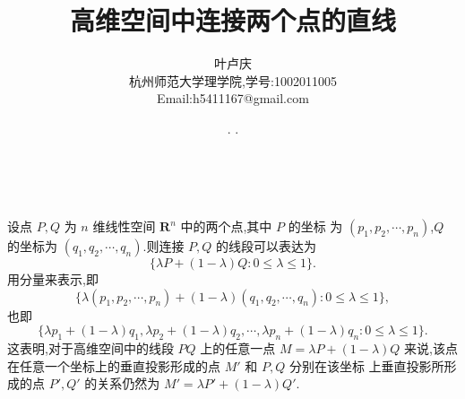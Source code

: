 \documentclass[a4paper, 12pt]{article} %
\makeatletter
\renewcommand{\maketitle}{ %
  \renewcommand\refname{参考文献}
  \newcommand{\D}{\displaystyle}\newcommand{\ri}{\Rightarrow}
  \newcommand{\ds}{\displaystyle} \renewcommand{\ni}{\noindent}
  \newcommand{\pa}{\partial} \newcommand{\Om}{\Omega}
  \newcommand{\om}{\omega} \newcommand{\sik}{\sum_{i=1}^k}
  \newcommand{\vov}{\Vert\omega\Vert} \newcommand{\Umy}{U_{\mu_i,y^i}}
  \newcommand{\lamns}{\lambda_n^{^{\scriptstyle\sigma}}}
  \newcommand{\chiomn}{\chi_{_{\Omega_n}}}
  \newcommand{\ullim}{\underline{\lim}} \newcommand{\bsy}{\boldsymbol}
  \newcommand{\mvb}{\mathversion{bold}} \newcommand{\la}{\lambda}
  \newcommand{\La}{\Lambda} \newcommand{\va}{\varepsilon}
  \newcommand{\be}{\beta} \newcommand{\al}{\alpha}
  \newcommand{\dis}{\displaystyle} \newcommand{\R}{{\mathbb R}}
  \newcommand{\N}{{\mathbb N}} \newcommand{\cF}{{\mathcal F}}
  \newcommand{\gB}{{\mathfrak B}} \newcommand{\eps}{\epsilon}
  \begin{flushright} %
    {\LARGE\@title} %
    
    \vspace{50pt} %
    
    {\large\@author} %
    \\\@date %
    
    \vspace{40pt} %
  \end{flushright}
}
\makeatother
\begin{document}
  \title{\textbf{高维空间中连接两个点的直线}} 
  \author{\small{叶卢庆}\\{\small{杭州师范大学理学院,学号:1002011005}}\\{\small{Email:h5411167@gmail.com}}} %
  \renewcommand{\today}{\number\year. \number\month. \number\day}
  \date{\today} %
  
  
  
  \maketitle %
  
  
  
  
  
  
  
设点 $P,Q$ 为 $n$ 维线性空间 $\mathbf{R}^n$ 中的两个点,其中 $P$ 的坐标
为 $(p_1,p_2,\cdots,p_n)$,$Q$ 的坐标为 $(q_1,q_2,\cdots,q_n)$.则连接
$P,Q$ 的线段可以表达为
$$
\{\lambda P+(1-\lambda)Q:0\leq\lambda\leq 1\}.
$$
用分量来表示,即
$$
\{\lambda(p_1,p_2,\cdots,p_n)+(1-\lambda)(q_1,q_2,\cdots,q_n):0\leq\lambda\leq 1\},
$$
也即
$$
\{\lambda p_1+(1-\lambda) q_1,\lambda
p_2+(1-\lambda)q_2,\cdots,\lambda p_n+(1-\lambda)q_n:0\leq\lambda\leq 1\}.
$$
这表明,对于高维空间中的线段 $PQ$ 上的任意一点 $M=\lambda P+(1-\lambda)Q$
来说,该点在任意一个坐标上的垂直投影形成的点 $M'$ 和 $P,Q$ 分别在该坐标
上垂直投影所形成的点 $P',Q'$ 的关系仍然为 $M'=\lambda P'+(1-\lambda) Q'$.
  
  
  
  
  
\end{document}
